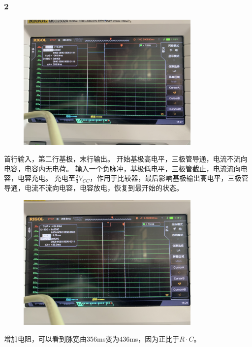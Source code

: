 \documentclass[UTF8, a4paper, 11pt]{article}
\begin{document}
\subsubsection{2}
\begin{figure}[H]
    \centering
    \includegraphics[width=0.8\textwidth]{1.png}
\end{figure}
首行输入，第二行基极，末行输出。
开始基极高电平，三极管导通，电流不流向电容，电容内无电荷。
输入一个负脉冲，基极低电平，三极管截止，电流流向电容，电容充电。
充电至$\frac23V_{CC}$，作用于比较器，最后影响基极输出高电平，三极管导通，电流不流向电容，电容放电，恢复到最开始的状态。
\begin{figure}[H]
    \centering
    \includegraphics[width=0.8\textwidth]{2.png}
\end{figure}
增加电阻，可以看到脉宽由356ms变为436ms，因为正比于$R\cdot C$。
\end{document}

